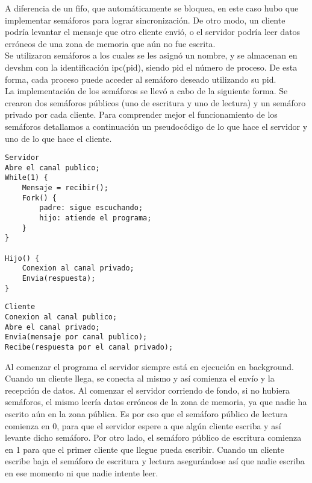 \documentclass[a4paper, 10pt]{article}
\begin{document}
A diferencia de un fifo, que automáticamente se bloquea, en este caso hubo que implementar semáforos para lograr sincronización. De otro modo, un cliente podría levantar el mensaje que otro cliente envió, o el servidor podría leer datos erróneos de una zona de memoria que aún no fue escrita.\\

Se utilizaron semáforos a los cuales se les asignó un nombre, y se almacenan en \/dev\/shm con la identificación ipc(pid), siendo pid el número de proceso. De esta forma, cada proceso puede acceder al semáforo deseado utilizando su pid.\\

La implementación de los semáforos se llevó a cabo de la siguiente forma. Se crearon dos semáforos públicos (uno de escritura y uno de lectura) y un semáforo privado por cada cliente. Para comprender mejor el funcionamiento de los semáforos detallamos a continuación un pseudocódigo de lo que hace el servidor y uno de lo que hace el cliente.\\

\begin{lstlisting}
Servidor
Abre el canal publico;
While(1) {
	Mensaje = recibir();
	Fork() {
		padre: sigue escuchando;
		hijo: atiende el programa;
	}	
}

Hijo() {
	Conexion al canal privado;
	Envia(respuesta);
}
\end{lstlisting}
\vspace{1.5em}

\begin{lstlisting}
Cliente
Conexion al canal publico;
Abre el canal privado;
Envia(mensaje por canal publico);
Recibe(respuesta por el canal privado);
\end{lstlisting}
\vspace{1.5em}

Al comenzar el programa el servidor siempre está en ejecución en background. Cuando un cliente llega, se conecta al mismo y así comienza el envío y la recepción de datos. Al comenzar el servidor corriendo de fondo, si no hubiera semáforos, el mismo leería datos erróneos de la zona de memoria, ya que nadie ha escrito aún en la zona pública. Es por eso que el semáforo público de lectura comienza en 0, para que el servidor espere a que algún cliente escriba y así levante dicho semáforo. Por otro lado, el semáforo público de escritura comienza en 1 para que el primer cliente que llegue pueda escribir. Cuando un cliente escribe baja el semáforo de escritura y lectura asegurándose así que nadie escriba en ese momento ni que nadie intente leer.\\
\end{document}
